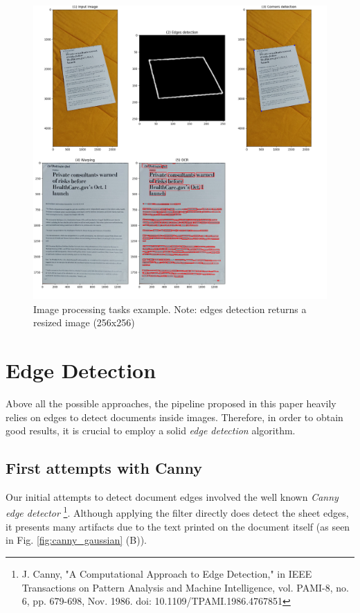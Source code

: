 \documentclass[a4paper]{article}
\begin{document}
\begin{figure}[!htbp]
	\includegraphics[width=\linewidth]{ipt.png}
	\caption{Image processing tasks example. Note: edges detection returns a resized image (256x256)}
	\label{fig:imageprocessing}
\end{figure}





\section{Edge Detection}

Above all the possible approaches, the pipeline proposed in this paper heavily
relies on edges to detect documents inside images. Therefore, in order to obtain
good results, it is crucial to employ a solid \textit{edge detection} algorithm.


\subsection{First attempts with Canny}

Our initial attempts to detect document edges involved the well known \textit{Canny edge detector} \footnote{J. Canny, "A Computational Approach to Edge Detection," in IEEE Transactions on Pattern Analysis and Machine Intelligence, vol. PAMI-8, no. 6, pp. 679-698, Nov. 1986.
	doi: 10.1109/TPAMI.1986.4767851}. 
Although applying the filter directly does detect the sheet edges, it presents many artifacts
due to the text printed on the document itself (as seen in Fig. \ref{fig:canny_gaussian} (B)).
\end{document}

